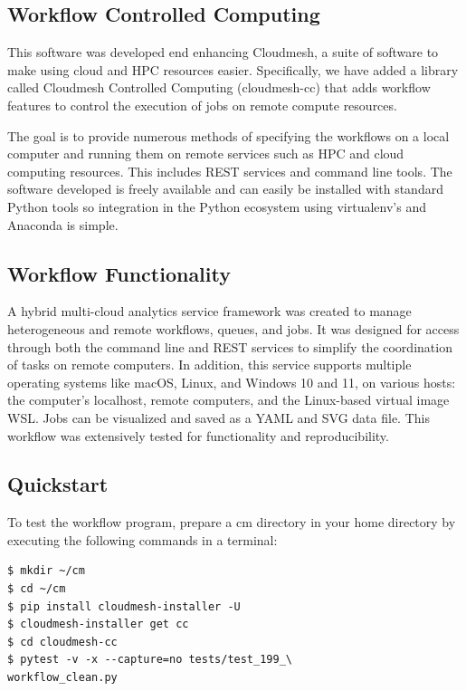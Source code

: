 \subsection{Workflow Controlled
Computing}\label{workflow-controlled-computing}

This software was developed end enhancing Cloudmesh, a suite of software
to make using cloud and HPC resources easier. Specifically, we have
added a library called Cloudmesh Controlled Computing (cloudmesh-cc)
that adds workflow features to control the execution of jobs on remote
compute resources.

The goal is to provide numerous methods of specifying the workflows on a
local computer and running them on remote services such as HPC and cloud
computing resources. This includes REST services and command line tools.
The software developed is freely available and can easily be installed
with standard Python tools so integration in the Python ecosystem using
virtualenv's and Anaconda is simple.


\subsection{Workflow Functionality}\label{workflow-functionality}

A hybrid multi-cloud analytics service framework was created to manage
heterogeneous and remote workflows, queues, and jobs. It was designed
for access through both the command line and REST services to simplify
the coordination of tasks on remote computers. In addition, this service
supports multiple operating systems like macOS, Linux, and Windows 10
and 11, on various hosts: the computer's localhost, remote computers,
and the Linux-based virtual image WSL. Jobs can be visualized and saved
as a YAML and SVG data file. This workflow was extensively tested for
functionality and reproducibility.

\subsection{Quickstart}\label{quickstart}

To test the workflow program, prepare a cm directory in your home
directory by executing the following commands in a terminal:

\begin{verbatim}
$ mkdir ~/cm
$ cd ~/cm
$ pip install cloudmesh-installer -U
$ cloudmesh-installer get cc
$ cd cloudmesh-cc
$ pytest -v -x --capture=no tests/test_199_\
workflow_clean.py
\end{verbatim}


